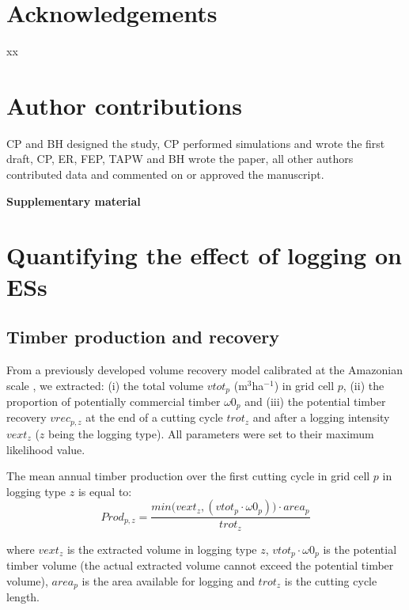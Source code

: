 \documentclass{article}
\newcommand{\beginsupplement}{%
        \setcounter{table}{0}
        \renewcommand{\thetable}{S\arabic{table}}%
        \setcounter{figure}{0}
        \renewcommand{\thefigure}{S\arabic{figure}}%
     }
\begin{document}
\section{Acknowledgements}
xx

\section{Author contributions}
CP and BH designed the study, CP performed simulations and wrote the first draft, CP, ER, FEP, TAPW and BH wrote the paper, all other authors contributed data and commented on or approved the manuscript.

\clearpage





\onecolumn
\beginsupplement
\appendix
\begin{center}
    { \huge \textbf{Supplementary material}}
\end{center} 

\section{Quantifying the effect of logging on ESs}
\label{sec:ESestimation}

\subsection{Timber production and recovery}

From a previously developed volume recovery model calibrated at the Amazonian scale \cite{Piponiotc}, we extracted: (i) the total volume $vtot_p$ (m$^3$ha$^{-1}$) in grid cell $p$, (ii) the proportion of potentially commercial timber $\omega 0_p$ and (iii) the potential timber recovery $vrec_{p,z}$ at the end of a cutting cycle $trot_z$ and after a logging intensity $vext_z$ ($z$ being the logging type). All parameters were set to their maximum likelihood value.

The mean annual timber production over the first cutting cycle in grid cell $p$ in logging type $z$ is equal to: 
\begin{equation}
\label{eq:prod}
    Prod_{p,z}  =  \frac{min\big(vext_z, (vtot_p\cdot \omega 0_p) \big) \cdot area_p}{trot_z}
\end{equation}

where $vext_z$ is the extracted volume in logging type $z$, $vtot_p\cdot \omega 0_p$ is the potential timber volume (the actual extracted volume cannot exceed the potential timber volume), $area_p$ is the area available for logging and $trot_z$ is the cutting cycle length.
\end{document}

